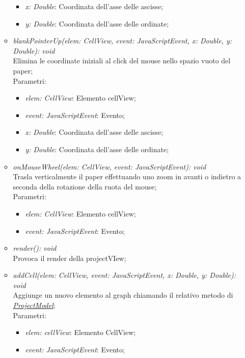 \documentclass[../DefinizioneDiProdotto.tex]{subfiles}
\begin{document}
\begin{itemize}
\begin{itemize}
\begin{itemize}
								\item \emph{x: Double}: Coordinata dell'asse delle ascisse;
								\item \emph{y: Double}: Coordinata dell'asse delle ordinate;
							\end{itemize}
							\item \emph{blankPointerUp(elem: CellView, event: JavaScriptEvent, x: Double, y: Double): void} \\
							Elimina le coordinate iniziali al click del mouse nello spazio vuoto del paper; \\
							Parametri:
							\begin{itemize}
								\item \emph{elem: CellView}: Elemento cellView;
								\item \emph{event: JavaScriptEvent}: Evento;
								\item \emph{x: Double}: Coordinata dell'asse delle ascisse;
								\item \emph{y: Double}: Coordinata dell'asse delle ordinate;
							\end{itemize}
							\item \emph{onMouseWheel(elem: CellView, event: JavaScriptEvent): void} \\
							Trasla verticalmente il paper effettuando uno zoom in avanti o indietro a seconda della rotazione della ruota del mouse; \\
							Parametri:
							\begin{itemize}
								\item \emph{elem: CellView}: Elemento cellView;
								\item \emph{event: JavaScriptEvent}: Evento;
							\end{itemize}
							\item \emph{render(): void} \\
							Provoca il render della projectVIew;
							\item \emph{addCell(elem: CellView, event: JavaScriptEvent, x: Double, y: Double): void} \\
							Aggiunge un nuovo elemento al graph chiamando il relativo metodo di \hyperlink{SWEDesigner::Model::ProjectModel}{\emph{ProjectModel}}; \\
							Parametri:
							\begin{itemize}
								\item \emph{elem: cellView}: Elemento CellView;
								\item \emph{event: JavaScriptEvent}: Evento;

\end{itemize}
\end{itemize}
\end{itemize}
\end{document}
